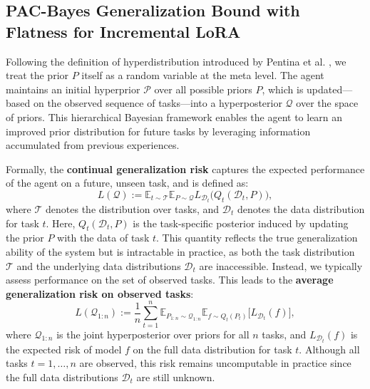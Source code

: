\documentclass[letterpaper]{article} %
\begin{document}
\subsection{PAC-Bayes Generalization Bound with Flatness for Incremental LoRA}



Following the definition of hyperdistribution introduced by Pentina et al. , we treat the prior $P$ itself as a random variable at the meta level. The agent maintains an initial hyperprior $\mathcal{P}$ over all possible priors $P$, which is updated—based on the observed sequence of tasks—into a hyperposterior $\mathcal{Q}$ over the space of priors. This hierarchical Bayesian framework enables the agent to learn an improved prior distribution for future tasks by leveraging information accumulated from previous experiences.



Formally, the \textbf{continual generalization risk} captures the expected performance of the agent on a future, unseen task, and is defined as:
\begin{equation}
L(\mathcal{Q}) := \mathbb{E}_{t \sim \mathcal{T}}\mathbb{E}_{P \sim \mathcal{Q}}L_{\mathcal{D}_t}\big(Q_t(\mathcal{D}_t, P)\big),
\end{equation}
where $\mathcal{T}$ denotes the distribution over tasks, and $\mathcal{D}_t$ denotes the data distribution for task $t$. Here, $Q_t(\mathcal{D}_t, P)$ is the task-specific posterior induced by updating the prior $P$ with the data of task $t$. This quantity reflects the true generalization ability of the system but is intractable in practice, as both the task distribution $\mathcal{T}$ and the underlying data distributions $\mathcal{D}_t$ are inaccessible. 
Instead, we typically assess performance on the set of observed tasks. This leads to the \textbf{average generalization risk on observed tasks}:
\begin{equation}
L(\mathcal{Q}_{1:n}) :=
\frac{1}{n} \sum_{t=1}^n
\mathbb{E}_{P_{1:n} \sim \mathcal{Q}_{1:n}}
\mathbb{E}_{f \sim Q_t(P_t)}
\big[
L_{\mathcal{D}_t}(f)
\big],
\end{equation}
where $\mathcal{Q}_{1:n}$ is the joint hyperposterior over priors for all $n$ tasks, and $L_{\mathcal{D}_t}(f)$ is the expected risk of model $f$ on the full data distribution for task $t$. Although all tasks $t=1,\dots,n$ are observed, this risk remains uncomputable in practice since the full data distributions $\mathcal{D}_t$ are still unknown.
\end{document}
